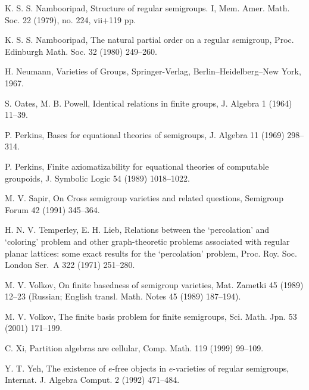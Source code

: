 \documentclass[preprint,1p,times]{elsarticle}
\numberwithin{equation}{section}
\theoremstyle{remark}
\begin{document}
\begin{thebibliography}{99}
K. S. S. Nambooripad, Structure of regular semigroups. I, Mem. Amer. Math. Soc. 22 (1979), no. 224, vii+119 pp.

K. S. S. Nambooripad, The natural partial order on a regular semigroup, Proc. Edinburgh Math. Soc. 32 (1980) 249--260.

H. Neumann, Varieties of Groups, Springer-Verlag, Berlin--Heidelberg--New York, 1967.

S. Oates, M. B. Powell, Identical relations in finite groups, J. Algebra 1 (1964) 11--39.

P. Perkins, Bases for equational theories of semigroups, J. Algebra 11 (1969) 298--314.

P. Perkins, Finite axiomatizability for equational theories of computable groupoids, J. Symbolic Logic 54 (1989)
1018--1022.



M. V. Sapir, On Cross semigroup varieties and related questions, Semigroup Forum 42 (1991) 345--364.

H. N. V. Temperley, E. H. Lieb, Relations between the `percolation' and `coloring' problem and other graph-theoretic
problems associated with regular planar lattices: some exact results for the `percolation' problem, Proc. Roy. Soc.
London Ser.~A  322 (1971) 251--280.

M. V. Volkov, On finite basedness of semigroup varieties, Mat. Zametki 45 (1989) 12--23 (Russian; English transl. Math.
Notes 45 (1989) 187--194).

M. V. Volkov, The finite basis problem for finite semigroups, Sci. Math. Jpn. 53 (2001) 171--199.

C. Xi, Partition algebras are cellular, Comp. Math. 119 (1999) 99--109.

Y. T. Yeh, The existence of $e$-free objects in {$e$-varieties} of regular semigroups, Internat. J. Algebra Comput. 2
(1992) 471--484.

\end{thebibliography}
\end{document}

